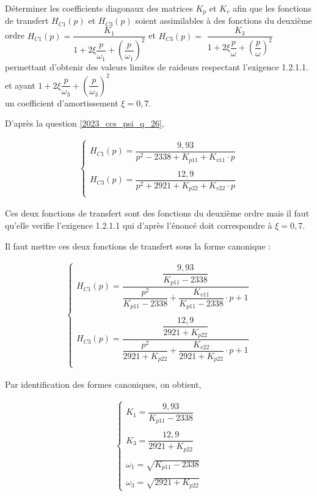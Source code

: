 \begin{question}
\label{2023_ccs_psi_q_28}
Déterminer les coefficients diagonaux des matrices $K_{p}$ et $K_{v}$ afin que les fonctions de transfert $H_{C 1}(p)$ et $H_{C 3}(p)$ soient assimilables à des fonctions du deuxième ordre $H_{C 1}(p)=\dfrac{K_{1}}{1+2 \xi \dfrac{p}{\omega_{1}}+\left(\dfrac{p}{\omega_{1}}\right)^{2}}$ et $H_{C 3}(p)=$ $\dfrac{K_{3}}{1+2 \xi \dfrac{p}{\omega}+\left(\dfrac{p}{\omega}\right)^{2}}$ permettant d'obtenir des valeurs limites de raideurs respectant l'exigence 1.2.1.1. et ayant $1+2 \xi \dfrac{p}{\omega_{3}}+\left(\dfrac{p}{\omega_{3}}\right)^{2}$\\
un coefficient d'amortissement $\xi=0,7$.\\
\end{question}
\ifprof
\begin{corrige}
D'après la question \ref{2023_ccs_psi_q_26},




\begin{align*}
\left\{
\begin{array}{l}
H_{C1}(p)=\dfrac{9,93}{p^2-2338+K_{p11}+K_{v11}\cdot p}\\
\\
H_{C3}(p)=\dfrac{12,9}{p^2+2921+K_{p22}+K_{v22}\cdot p}\\
\end{array}
\right.
\end{align*}

Ces deux fonctions de transfert sont des fonctions du deuxième ordre mais il faut qu'elle verifie l'exigence 1.2.1.1 qui d'après l'énoncé doit correspondre à $\xi=0,7$.

Il faut mettre ces deux fonctions de transfert sous la forme canonique : 

\begin{align*}
\left\{
\begin{array}{l}
H_{C1}(p)=\dfrac{\dfrac{9,93}{K_{p11}-2338}}{\dfrac{p^2}{K_{p11}-2338}+\dfrac{K_{v11}}{K_{p11}-2338}\cdot p+1}\\
\\
H_{C3}(p)=\dfrac{\dfrac{12,9}{2921+K_{p22}}}{\dfrac{p^2}{2921+K_{p22}}+\dfrac{K_{v22}}{2921+K_{p22}}\cdot p+1}\\
\end{array}
\right.
\end{align*}

Par identification des formes canoniques, on obtient,

\begin{align*}
\left\{
\begin{array}{l}
K_1=\dfrac{9,93}{K_{p11}-2338}\\
\\
K_3=\dfrac{12,9}{2921+K_{p22}}\\
\\
\omega_1=\sqrt{K_{p11}-2338}\\
\\
\omega_3=\sqrt{2921+K_{p22}}
\end{array}
\right.
\end{align*}


\end{corrige}
